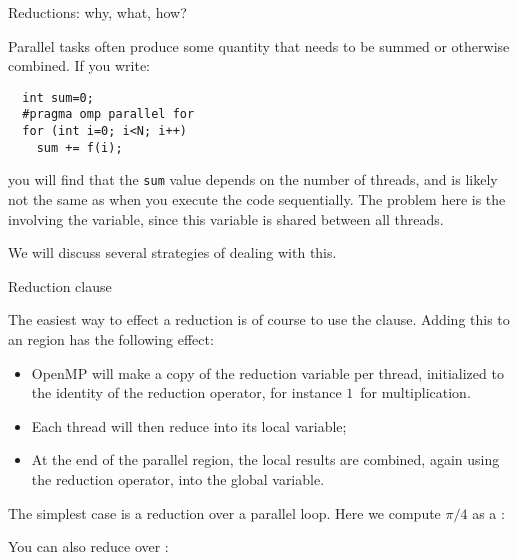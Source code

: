 
\label{sec:reduction}

 {Reductions: why, what, how?}
\label{sec:reduct-intro}

Parallel tasks often produce some quantity that needs to be summed
or otherwise combined.
If you write:
\begin{lstlisting}
  int sum=0;
  #pragma omp parallel for
  for (int i=0; i<N; i++)
    sum += f(i);
\end{lstlisting}
you will find that the \lstinline{sum} value depends on the number of threads,
and is likely not the same as when you execute the code sequentially.
The problem here is the  involving the 
variable, since this variable is shared between all threads.

We will discuss several strategies of dealing with this.

 {Reduction clause}

The easiest way to effect a reduction is of course to use the 
clause.
Adding this to an  region
has the following effect:
\begin{itemize}
\item OpenMP will make a copy of the reduction variable per thread,
  initialized to the identity of the reduction operator, for instance
  $1$~for multiplication.
\item Each thread will then reduce into its local variable;
\item At the end of the parallel region, the local results are combined, again
  using the reduction operator, into the global variable.
\end{itemize}

The simplest case is a reduction over a parallel loop.
Here we compute $\pi/4$ as a :


You can also reduce over :
%

